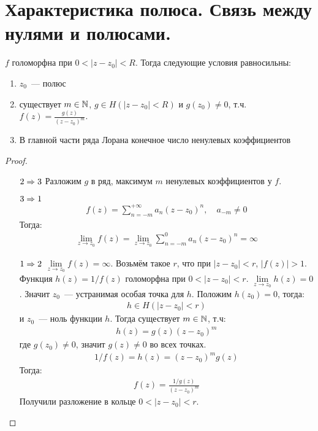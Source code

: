 \section{Характеристика полюса. Связь между нулями и полюсами.}

\begin{theorem}

    $f$ голоморфна при $0 < |z-z_0| < R$. Тогда
    следующие условия равносильны:

    \begin{enumerate}
        \item $z_0$~--- полюс
        \item существует $m \in \mathbb{N}$, $g \in H(|z-z_0|<R)$
              и $g(z_0) \ne 0$, т.ч. $f(z) = \frac{g(z)}{(z-z_0)^m}$.
        \item В главной части ряда Лорана конечное число
              ненулевых коэффициентов
    \end{enumerate}
\end{theorem}

\begin{proof} \quad 

    \begin{itemize}
        \item[$2 \Rightarrow 3$] Разложим $g$ в ряд, максимум $m$ ненулевых
        коэффициентов у $f$.
        \item[$3 \Rightarrow 1$] 
            \begin{gather*}
                f(z) = \sum\limits_{n=-m}^{+\infty} a_n(z-z_0)^n, \quad a_{-m} \ne 0
            \end{gather*}
            Тогда: 
            \begin{gather*}
                \lim\limits_{z \to z_0} f(z) = \lim\limits_{z \to z_0} \sum\limits_{n=-m}^{0} a_n(z-z_0)^n = \infty
            \end{gather*}
        \item[$1 \Rightarrow 2$] $\lim\limits_{z \to z_0} f(z) = \infty$.
        Возьмём такое $r$, что при $|z-z_0| < r$, $|f(z)| > 1$.
        Функция $h(z) = 1/f(z)$ голоморфна при $0 < |z-z_0| < r$.
        $\lim\limits_{z\to z_0} h(z) = 0$. Значит $z_0$~--- устранимая
        особая точка для $h$. Положим $h(z_0) = 0$, тогда:
        \begin{gather*}
            h \in H(|z-z_0| < r)
        \end{gather*} 
        и $z_0$~--- ноль функции $h$.
        Тогда существует $m \in \mathbb{N}$, т.ч:
        \begin{gather*}
            h(z) = g(z)(z-z_0)^m
        \end{gather*}
        где $g(z_0) \ne 0$, значит $g(z) \ne 0$ во всех точках.
        \begin{gather*}
            1/f(z) = h(z) = (z-z_0)^m g(z)
        \end{gather*}
        Тогда: 
        \begin{gather*}
            f(z) = \frac{1/g(z)}{(z-z_0)^m}   
        \end{gather*}
        Получили разложение в кольце $0 < |z-z_0| < r$.
    \end{itemize}
\end{proof}


